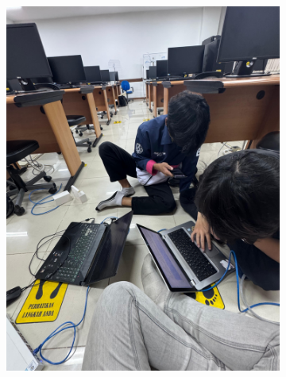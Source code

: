 \begin{figure}[H]
\begin{subfigure}[b]{0.4\linewidth}
		\includegraphics[width=\linewidth]{P3/img/dokum 2.jpg}
	\end{subfigure}
\end{figure}
